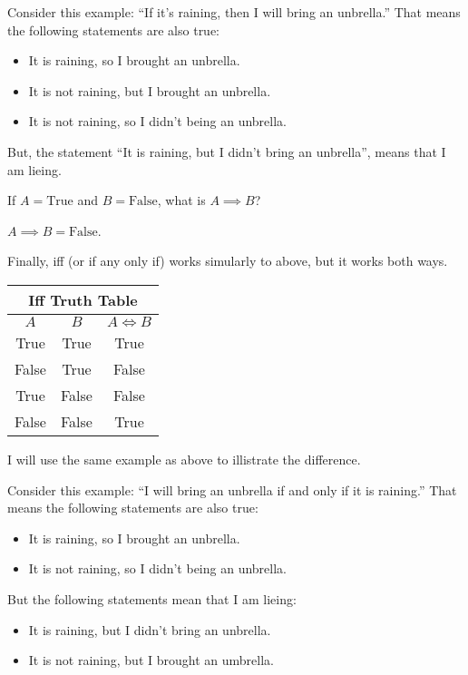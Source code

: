 \begin{boxexample}{}{}
	Consider this example: ``If it's raining, then I will bring an unbrella.'' That means the following statements are also true:
	\begin{itemize}
		\item It is raining, so I brought an unbrella.
		\item It is not raining, but I brought an unbrella.
		\item It is not raining, so I didn't being an unbrella.
	\end{itemize}
	But, the statement ``It is raining, but I didn't bring an unbrella'', means that I am lieing.
\end{boxexample}

\begin{boxexample}{}{}
	If $A=\text{True}$ and $B=\text{False}$, what is $A \implies B$?
	
	$A \implies B = \text{False}$.
\end{boxexample}

Finally, iff (or if any only if) works simularly to above, but it works both ways.

\medskip
\begin{tabular}{c|c|c}
	\hline
	\multicolumn{3}{c}{Iff Truth Table}\\
	\hline
	$A$ & $B$ & $A \iff B$\\
	\hline
	True & True & True\\
	False & True & False\\
	True & False & False\\
	False & False & True\\
	\hline
\end{tabular}
\medskip

I will use the same example as above to illistrate the difference.

\begin{boxexample}{}{}
	Consider this example: ``I will bring an unbrella if and only if it is raining.'' That means the following statements are also true:
	\begin{itemize}
		\item It is raining, so I brought an unbrella.
		\item It is not raining, so I didn't being an unbrella.
	\end{itemize}
	But the following statements mean that I am lieing:
	\begin{itemize}
		\item It is raining, but I didn't bring an unbrella.
		\item It is not raining, but I brought an umbrella.
	\end{itemize}
\end{boxexample}

